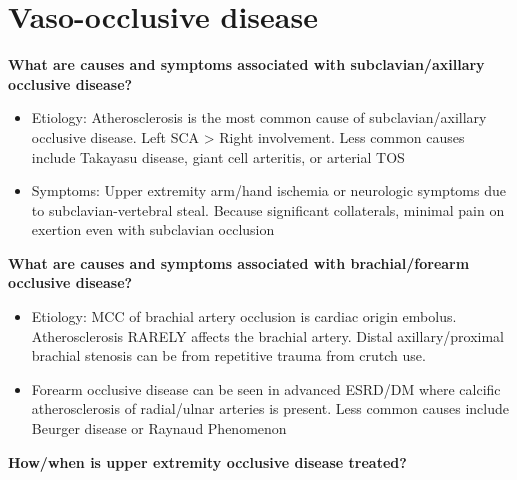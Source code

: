 \documentclass[
]{book}
\begin{document}
\hypertarget{vaso-occlusive-disease}{%
\section{Vaso-occlusive disease}\label{vaso-occlusive-disease}}

\textbf{What are causes and symptoms associated with subclavian/axillary
occlusive disease?} \citet{jacklcronenwettVascularDecisionMaking2020}

\begin{itemize}
\item
  Etiology: Atherosclerosis is the most common cause of
  subclavian/axillary occlusive disease. Left SCA \textgreater{} Right involvement.
  Less common causes include Takayasu disease, giant cell arteritis,
  or arterial TOS
\item
  Symptoms: Upper extremity arm/hand ischemia or neurologic symptoms
  due to subclavian-vertebral steal. Because significant collaterals,
  minimal pain on exertion even with subclavian occlusion
\end{itemize}

\textbf{What are causes and symptoms associated with brachial/forearm
occlusive disease?}

\begin{itemize}
\item
  Etiology: MCC of brachial artery occlusion is cardiac origin
  embolus. Atherosclerosis RARELY affects the brachial artery. Distal
  axillary/proximal brachial stenosis can be from repetitive trauma
  from crutch use.~
\item
  Forearm occlusive disease can be seen in advanced ESRD/DM where
  calcific atherosclerosis of radial/ulnar arteries is present. Less
  common causes include Beurger disease or Raynaud Phenomenon~
\end{itemize}

\textbf{How/when is upper extremity occlusive disease treated?}
\end{document}
